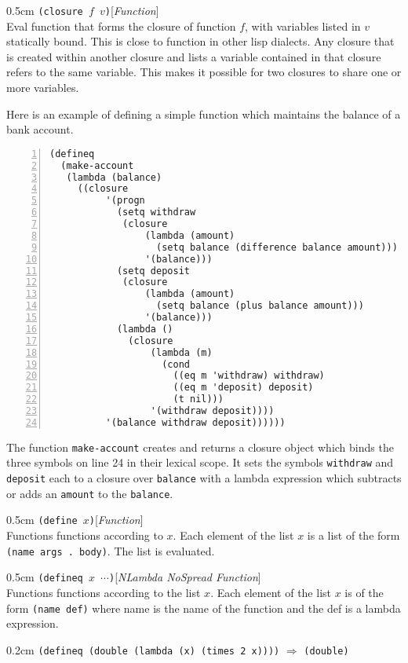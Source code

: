 \documentclass[a4paper]{article}
\newcommand{\lisp}[1]{\texttt{#1}}
\newenvironment{defun}[2]{\begin{adjustwidth}{0.5cm}{}
    {\hspace*{-0.5cm}\lisp{#2}\hfill[\textit{#1}]\\}}
               {\end{adjustwidth}}
\newcommand{\example}[2]{
  \begin{adjustwidth}{0.2cm}{}
    \lisp{#1} $\Rightarrow$ \lisp{#2}
  \end{adjustwidth}
}
\begin{document}
\begin{defun}{Function}{(closure $f$ $v$)}
  \label{closure}
  Eval function that forms the closure of function $f$, with variables
  listed in $v$ statically bound.  This is close to function in other
  lisp dialects. Any closure that is created within another closure
  and lists a variable contained in that closure refers to the same
  variable. This makes it possible for two closures to share one or
  more variables.

  Here is an example of defining a simple function which maintains the
  balance of a bank account.

  \begin{lstlisting}[numbers=left,numberstyle=\tiny]
(defineq
  (make-account
   (lambda (balance)
     ((closure
          '(progn
            (setq withdraw
             (closure
                 (lambda (amount)
                   (setq balance (difference balance amount)))
                 '(balance)))
            (setq deposit
             (closure
                 (lambda (amount)
                   (setq balance (plus balance amount)))
                 '(balance)))
            (lambda ()
              (closure
                  (lambda (m)
                    (cond
                      ((eq m 'withdraw) withdraw)
                      ((eq m 'deposit) deposit)
                      (t nil)))
                  '(withdraw deposit))))
          '(balance withdraw deposit))))))
  \end{lstlisting}

  The function \lisp{make-account} creates and returns a closure
  object which binds the three symbols on line 24 in their lexical
  scope. It sets the symbols \lisp{withdraw} and \lisp{deposit} each
  to a closure over \lisp{balance} with a lambda expression which
  subtracts or adds an \lisp{amount} to the \lisp{balance}.
\end{defun}


\begin{defun}{Function}{(define $x$)}
  Functions functions according to $x$. Each element of the list $x$
  is a list of the form \lisp{(name args .\ body)}. The list is
  evaluated.
\end{defun}

\begin{defun}{NLambda NoSpread Function}{(defineq $x$ $\cdots$)}
  Functions functions according to the list $x$. Each element of the
  list $x$ is of the form \lisp{(name def)} where name is the name of
  the function and the def is a lambda expression.

  \example{(defineq (double (lambda (x) (times 2 x))))}{(double)}
\end{defun}
\end{document}
